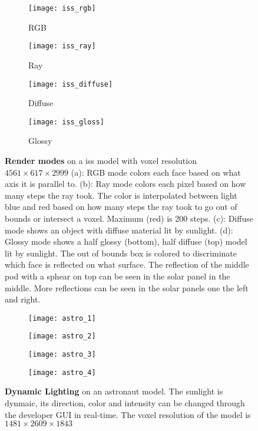 \begin{figure}[H]
  \centering
  \begin{subfigure}[b]{0.48\textwidth}
    \texttt{[image: iss\_rgb]}
    \caption{RGB}
  \end{subfigure}
  \hfill
  \begin{subfigure}[b]{0.48\textwidth}
    \texttt{[image: iss\_ray]}
    \caption{Ray}
  \end{subfigure}
  \begin{subfigure}[b]{0.48\textwidth}
    \texttt{[image: iss\_diffuse]}
    \caption{Diffuse}
  \end{subfigure}
  \hfill
  \begin{subfigure}[b]{0.48\textwidth}
    \texttt{[image: iss\_gloss]}
    \caption{Glossy}
  \end{subfigure}
  \caption{\textbf{Render modes} on a \acrshort{iss} model with voxel resolution $4561\times617\times2999$
    (a): RGB mode colors each face based on what axis it is parallel to.
    (b): Ray mode colors each pixel based on how many steps the ray took. The color is interpolated between light blue and red based on how many steps the ray took to go out of bounds or intersect a voxel. Maximum (red) is 200 steps.
    (c): Diffuse mode shows an object with diffuse material lit by sunlight.
    (d): Glossy mode shows a half glossy (bottom), half diffuse (top) model lit by sunlight. The out of bounds box is colored to discriminate which face is reflected on what surface. The reflection of the middle pod with a sphear on top can be seen in the solar panel in the middle. More reflections can be seen in the solar panels one the left and right.
  }
  \label{rendermods}
\end{figure}


\begin{figure}[H]
  \centering
  \begin{subfigure}[b]{0.48\textwidth}
    \texttt{[image: astro\_1]}
  \end{subfigure}
  \hfill
  \begin{subfigure}[b]{0.48\textwidth}
    \texttt{[image: astro\_2]}
  \end{subfigure}
  \begin{subfigure}[b]{0.48\textwidth}
    \texttt{[image: astro\_3]}
  \end{subfigure}
  \hfill
  \begin{subfigure}[b]{0.48\textwidth}
    \texttt{[image: astro\_4]}
  \end{subfigure}
  \caption{\textbf{Dynamic Lighting} on an astronaut model. The sunlight is dynmaic, its direction, color and intensity can be changed through the developer GUI in real-time. The voxel resolution of the model is $1481\times2609\times1843$}
\end{figure}

